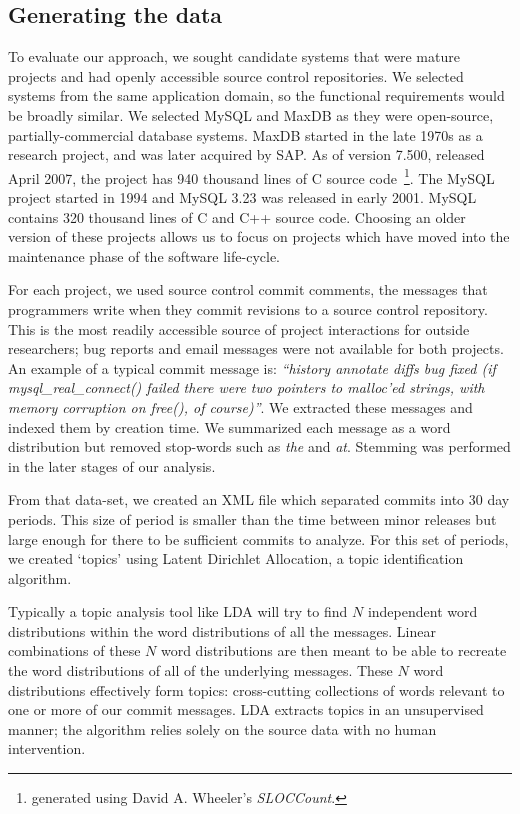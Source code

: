 \documentclass[]{sig-alternate}
\begin{document}
\subsection{Generating the data}
\label{sec:wordlist}
To evaluate our approach, we sought candidate systems that were mature projects and had openly accessible source control repositories. We selected systems from the same application domain, so the functional requirements would be broadly similar. We selected MySQL and MaxDB as they were open-source, partially-commercial database systems. MaxDB started in the late 1970s as a research project, and was later acquired by SAP. As of version 7.500, released April 2007, the project has 940 thousand lines of C source code~\footnote{generated using David A. Wheeler's \emph{SLOCCount}.}. The MySQL project started in 1994 and MySQL 3.23 was released in early 2001. MySQL contains 320 thousand lines of C and C++ source code.  Choosing an older version of these projects allows us to focus on projects which have moved into the maintenance phase of the software life-cycle.

For each project, we used source control commit comments, the messages that programmers write when they commit revisions to a source control repository. This is the most readily accessible source of project interactions for outside researchers; bug reports and email messages were not available for both projects. An example of a typical commit message is: \textit{``history annotate diffs bug fixed (if mysql\-\_real\-\_connect() failed there were two pointers to malloc'ed strings, with memory corruption on free(), of course)''}. We extracted these messages and indexed them by creation time. We summarized each message as a word distribution but removed stop-words such as \emph{the} and \emph{at}. Stemming was performed in the later stages of our analysis.

From that data-set, we created an XML file which separated commits into 30 day periods. This size of period is smaller than the time between minor releases but large enough for there to be sufficient commits to analyze. For this set of periods, we created `topics' using Latent Dirichlet Allocation, a topic identification algorithm. 

Typically a topic analysis tool like LDA will try to find $N$ independent word distributions within the word distributions of all the messages. Linear combinations of these $N$ word distributions are then meant to be able to recreate the word distributions of all of the underlying messages. These $N$ word distributions effectively form topics: cross-cutting collections of words relevant to one or more of our commit messages. LDA extracts topics in an unsupervised manner; the algorithm relies solely on the source data with no human intervention.
\end{document}

